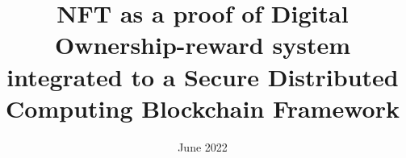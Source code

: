 \documentclass[12pt]{report}
\title{NFT as a proof of Digital Ownership-reward system integrated to a Secure Distributed Computing Blockchain Framework}
\date{June 2022}
\begin{document}
\frontmatter
\pagestyle{empty} 
\declaration





\tableofcontents


\mainmatter





















 






\listoffigures

\appendix

\newpage


 \backmatter
 \label{Bibliography}

\uisbackcover
\end{document}
